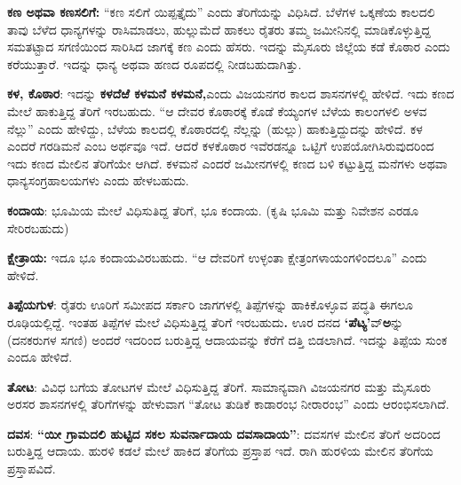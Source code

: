 \textbf{ಕಣ ಅಥವಾ ಕಣಸಲಿಗೆ:} “ಕಣ ಸಲಿಗೆ ಯಿಪ್ಪತ್ತೈದು” ಎಂದು ತೆರಿಗೆಯನ್ನು ವಿಧಿಸಿದೆ. ಬೆಳೆಗಳ ಒಕ್ಕಣೆಯ ಕಾಲದಲಿ ತಾವು ಬೆಳೆದ ಧಾನ್ಯಗಳನ್ನು ರಾಸಿಮಾಡಲು, ಹುಲ್ಲುಮೆದೆ ಹಾಕಲು ರೈತರು ತಮ್ಮ ಜಮೀನಿನಲ್ಲಿ ಮಾಡಿಕೊಳ್ಳುತ್ತಿದ್ದ ಸಮತಟ್ಟಾದ ಸಗಣಿಯಿಂದ ಸಾರಿಸಿದ ಜಾಗಕ್ಕೆ ಕಣ ಎಂದು ಹೆಸರು. ಇದನ್ನು ಮೈಸೂರು ಜಿಲ್ಲೆಯ ಕಡೆ ಕೊಠಾರ ಎಂದು ಕರೆಯುತ್ತಾರೆ. ಇದನ್ನು ಧಾನ್ಯ ಅಥವಾ ಹಣದ ರೂಪದಲ್ಲಿ ನೀಡಬಹುದಾಗಿತ್ತು.

\textbf{ಕಳ, ಕೊಠಾರ}: ಇದನ್ನು \textbf{ಕಳದೆಱೆ ಕಳಮನೆ ಕಳಮನೆ,}ಎಂದು ವಿಜಯನಗರ ಕಾಲದ ಶಾಸನಗಳಲ್ಲಿ ಹೇಳಿದೆ. ಇದು ಕಣದ ಮೇಲೆ ಹಾಕುತ್ತಿದ್ದ ತೆರಿಗೆ ಇರಬಹುದು. “ಆ ದೇವರ ಕೊಠಾರಕ್ಕೆ ಕೊಡೆ ಕೆಯ್ಯಂಗಳ ಬೆಳೆಯ ಕಾಲಂಗಳಲಿ ಅಳವ ನೆಲ್ಲು” ಎಂದು ಹೇಳಿದ್ದು, ಬೆಳೆಯ ಕಾಲದಲ್ಲಿ ಕೊಠಾರದಲ್ಲಿ ನೆಲ್ಲನ್ನು (ಹುಲ್ಲು) ಹಾಕುತ್ತಿದ್ದುದನ್ನು ಹೇಳಿದೆ. ಕಳ ಎಂದರೆ ಗರಡಿಮನೆ ಎಂಬ ಅರ್ಥವೂ ಇದೆ. ಆದರೆ ಕಳಕೊಠಾರ ಇವೆರಡನ್ನೂ ಒಟ್ಟಿಗೆ ಉಪಯೋಗಿಸಿರುವುದರಿಂದ ಇದು ಕಣದ ಮೇಲಿನ ತೆರಿಗೆಯೇ ಆಗಿದೆ. ಕಳಮನೆ ಎಂದರೆ ಜಮೀನಗಳಲ್ಲಿ ಕಣದ ಬಳಿ ಕಟ್ಟುತ್ತಿದ್ದ ಮನೆಗಳು ಅಥವಾ ಧಾನ್ಯಸಂಗ್ರಹಾಲಯಗಳು ಎಂದು ಹೇಳಬಹುದು. 

\textbf{ಕಂದಾಯ}: ಭೂಮಿಯ ಮೇಲೆ ವಿಧಿಸುತಿದ್ದ ತೆರಿಗೆ, ಭೂ ಕಂದಾಯ. (ಕೃಷಿ ಭೂಮಿ ಮತ್ತು ನಿವೇಶನ ಎರಡೂ ಸೇರಿರಬಹುದು)

\textbf{ಕ್ಷೇತ್ರಾಯ: } ಇದೂ ಭೂ ಕಂದಾಯವಿರಬಹುದು. “ಆ ದೇವರಿಗೆ ಉಳ್ಳಂತಾ ಕ್ಷೇತ್ರಂಗಳಾಯಂಗಳಿಂದಲೂ” ಎಂದು ಹೇಳಿದೆ.

\textbf{ತಿಪ್ಪೆಯಗುಳ}: ರೈತರು ಊರಿಗೆ ಸಮೀಪದ ಸರ್ಕಾರಿ ಜಾಗಗಳಲ್ಲಿ ತಿಪ್ಪೆಗಳನ್ನು ಹಾಕಿಕೊಳ್ಳೂವ ಪದ್ಧತಿ ಈಗಲೂ ರೂಢಿಯಲ್ಲಿದ್ದೆ. ಇಂತಹ ತಿಪ್ಪೆಗಳ ಮೇಲೆ ವಿಧಿಸುತ್ತಿದ್ದ ತೆರಿಗೆ ಇರಬಹುದು\textbf{.} ಊರ ದನದ \textbf{‘ಪೆಟ್ಯ’}ವ್\textbf{ಅ}ನ್ನು (ದನಕರುಗಳ ಸಗಣಿ) ಅಂದರೆ ಇದರಿಂದ ಬರುತ್ತಿದ್ದ ಆದಾಯವನ್ನು ಕೆರೆಗೆ ದತ್ತಿ ಬಿಡಲಾಗಿದೆ. ಇದನ್ನು ತಿಪ್ಪೆಯ ಸುಂಕ ಎಂದೂ ಹೇಳಿದೆ.

\textbf{ತೋಟ}: ವಿವಿಧ ಬಗೆಯ ತೋಟಗಳ ಮೇಲೆ ವಿಧಿಸುತ್ತಿದ್ದ ತೆರಿಗೆ. ಸಾಮಾನ್ಯವಾಗಿ ವಿಜಯನಗರ ಮತ್ತು ಮೈಸೂರು ಅರಸರ ಶಾಸನಗಳಲ್ಲಿ ತೆರಿಗೆಗಳನ್ನು ಹೇಳುವಾಗ “ತೋಟ ತುಡಿಕೆ ಕಾಡಾರಂಭ ನೀರಾರಂಭ” ಎಂದು ಆರಂಭಿಸಲಾಗಿದೆ. 

\textbf{ದವಸ}: \textbf{“ಯೀ ಗ್ರಾಮದಲಿ ಹುಟ್ಟಿದ ಸಕಲ ಸುವರ್ನಾದಾಯ ದವಸಾದಾಯ”}: ದವಸಗಳ ಮೇಲಿನ ತೆರಿಗೆ ಅದರಿಂದ ಬರುತ್ತಿದ್ದ ಆದಾಯ. ಹುರಳಿ ಕಡಲೆ ಮೇಲೆ ಹಾಕಿದ ತೆರಿಗೆಯ ಪ್ರಸ್ತಾಪ ಇದೆ. ರಾಗಿ ಹುರಳಿಯ ಮೇಲಿನ ತೆರಿಗೆಯ ಪ್ರಸ್ತಾಪವಿದೆ.

